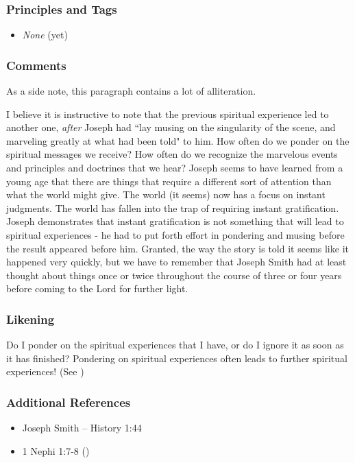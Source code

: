 \documentclass[12pt]{report}
\begin{document}
\subsubsection{Principles and Tags\label{js:principles11}}
\begin{itemize}
\item \index{}\emph{None} (yet)
\end{itemize}

\subsubsection{Comments\label{js:comments11}}
As a side note, this paragraph contains a lot of alliteration.

I believe it is instructive to note that the previous spiritual experience led to another one, \emph{after} Joseph had ``lay musing on the singularity of the scene, and marveling greatly at what had been told" to him.  How often do we ponder on the spiritual messages we receive?  How often do we recognize the marvelous events and principles and doctrines that we hear?  Joseph seems to have learned from a young age that there are things that require a different sort of attention than what the world might give.  The world (it seems) now has a focus on instant judgments.  The world has fallen into the trap of requiring instant gratification.  Joseph demonstrates that instant gratification is not something that will lead to spiritual experiences - he had to put forth effort in pondering and musing before the result appeared before him.  Granted, the way the story is told it seems like it happened very quickly, but we have to remember that Joseph Smith had at least thought about things once or twice throughout the course of three or four years before coming to the Lord for further light.

\subsubsection{Likening\label{js:likening11}}
Do I ponder on the spiritual experiences that I have, or do I ignore it as soon as it has finished?  Pondering on spiritual experiences often leads to further spiritual experiences! (See )

\subsubsection{Additional References\label{js:reference11}}
\begin{itemize}
\item Joseph Smith -- History 1:44
\item 1 Nephi 1:7-8 ()
\end{itemize}
\end{document}
